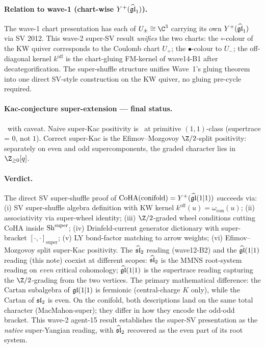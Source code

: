 \paragraph{Relation to wave-1 (chart-wise $Y^+(\widehat{\mathfrak{gl}}_1)$).}
The wave-1 chart presentation has each of $U_\pm\cong\C^3$ carrying its
own $Y^+(\widehat{\mathfrak{gl}}_1)$ via SV 2012. This wave-2 super-SV result
\emph{unifies} the two charts: the $\circ$-colour of the KW quiver
corresponds to the Coulomb chart $U_+$; the $\bullet$-colour to
$U_-$; the off-diagonal kernel $k^{\mathrm{off}}$ is the chart-gluing
FM-kernel of wave14-B1 after decategorification. The super-shuffle
structure unifies Wave~1's gluing theorem into one direct SV-style
construction on the KW quiver, no gluing pre-cycle required.

\paragraph{Kac-conjecture super-extension --- final status.}
\ClaimStatusVerified\ with caveat. Naive super-Kac positivity is
\ClaimStatusFalsified\ at primitive $(1,1)$-class (supertrace = $0$,
not $1$). Correct super-Kac is the Efimov--Mozgovoy $\Z/2$-split
positivity: separately on even and odd supercomponents, the graded
character lies in $\Z_{\geq 0}[q]$.

\paragraph{Verdict.}
The direct SV super-shuffle proof of $\mathrm{CoHA}(\mathrm{conifold})=
Y^+(\widehat{\mathfrak{gl}}(1|1))$ succeeds via: (i) SV super-shuffle algebra
definition with KW kernel $k^{\mathrm{off}}(u) = \omega_{\mathrm{con}}(u)$;
(ii) associativity via super-wheel identity; (iii) $\Z/2$-graded wheel
conditions cutting CoHA inside $\mathrm{Sh}^{\mathrm{super}}$; (iv) Drinfeld-current
generator dictionary with super-bracket $[\cdot,\cdot]_{\mathrm{super}}$;
(v) LY bond-factor matching to arrow weights; (vi) Efimov--Mozgovoy
split super-Kac positivity. The $\widehat{\mathfrak{sl}}_2$ reading (wave12-B2)
and the $\widehat{\mathfrak{gl}}(1|1)$ reading (this note) coexist at different
scopes: $\widehat{\mathfrak{sl}}_2$ is the MMNS root-system reading on
\emph{even} critical cohomology; $\widehat{\mathfrak{gl}}(1|1)$ is the
supertrace reading capturing the $\Z/2$-grading from the two vertices.
The primary mathematical difference: the Cartan subalgebra of
$\mathfrak{gl}(1|1)$ is fermionic (central-charge $K$ only), while the Cartan of
$\mathfrak{sl}_2$ is even. On the conifold, both descriptions land on the
same total character (MacMahon-super); they differ in how they encode
the odd-odd bracket. This wave-2 agent-15 result establishes the
super-SV presentation as the \emph{native} super-Yangian reading,
with $\widehat{\mathfrak{sl}}_2$ recovered as the even part of its root system.

